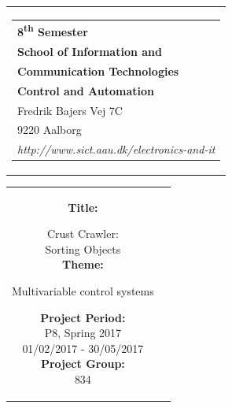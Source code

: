 \begin{nopagebreak}
{\samepage 

\begin{tabular}{r}
\parbox{\textwidth}{  
\hfill \hspace{2cm} \parbox{8cm}{\begin{tabular}{l} %
{\small \textbf{\textcolor{aaublue}{\colorbox{white}{8\textsuperscript{th} Semester}}}}\\
{\small \textbf{\textcolor{aaublue}{School of Information and}}}\\
{\small \textbf{\textcolor{aaublue}{Communication Technologies}}}\\ 
{\small \textbf{\textcolor{aaublue}{Control and Automation}}}\\
{\small \textcolor{aaublue}{Fredrik Bajers Vej 7C}} \\
{\small \textcolor{aaublue}{9220 Aalborg}} \\
{\small \textcolor{aaublue}{\emph{http://www.sict.aau.dk/electronics-and-it}}}
\end{tabular}}}
\end{tabular}

\begin{tabular}{cc}
\parbox{7cm}{

\textbf{Title:}

Crust Crawler:\\
Sorting Objects\\ %

\textbf{Theme:}

\small{
Multivariable control systems\\
}


\parbox{8cm}{


\textbf{Project Period:}\\
P8, Spring 2017\\
01/02/2017 - 30/05/2017\\
   
\textbf{Project Group:}\\
834\\ %
  
}}
\end{tabular}}
\end{nopagebreak}
